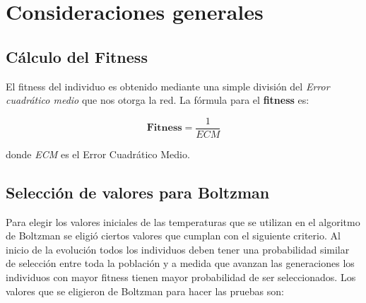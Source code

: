 \documentclass{sig-alternate}
\begin{document}





	\section{Consideraciones generales}

		\subsection{Cálculo del Fitness}

			El fitness del individuo es obtenido mediante una simple división del \textit{Error cuadrático medio} que nos otorga la red.
			La fórmula para el \textbf{fitness} es:

			\begin{equation}
				\textbf{Fitness} = \dfrac{1}{ECM}
			\end{equation}

			donde \textit{ECM} es el Error Cuadrático Medio.

		\subsection{Selección de valores para Boltzman}

			Para elegir los valores iniciales de las temperaturas que se utilizan en el algoritmo de Boltzman se eligió ciertos valores que cumplan con el siguiente criterio. Al inicio de la evolución todos los individuos deben tener una probabilidad similar de selección entre toda la población y a medida que avanzan las generaciones los individuos con mayor fitness tienen mayor probabilidad de ser seleccionados.
			Los valores que se eligieron de Boltzman para hacer las pruebas son:
			
\end{document}
